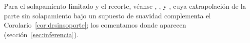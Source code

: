 Para el solapamiento limitado y el recorte, véanse \citet{crump2009}, \citet{ma2020,ma2023}, \citet{liu2023} y \citet{manamkoong2025}, cuya extrapolación de la parte sin solapamiento bajo un supuesto de suavidad complementa el Corolario~\ref{cor:drsinsoporte}; los comentamos donde aparecen (sección~\ref{sec:inferencia}).
